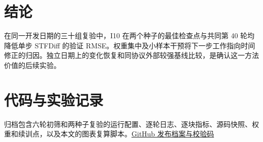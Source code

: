 \documentclass[a4paper,10pt,twocolumn]{article}
\begin{document}
\section{结论}
在同一开发日期的三十组复验中，I10 在两个种子的最佳检查点与共同第 40 轮均降低单步 STFDiff 的验证 RMSE。权重集中及小样本干预将下一步工作指向时间修正的归因。独立日期上的变化恢复和同协议外部较强基线比较，是确认这一方法价值的后续实验。

\section*{代码与实验记录}
归档包含六轮初筛和两种子复验的运行配置、逐轮日志、逐块指标、源码快照、权重和续训点，以及本文的图表复算脚本。\href{https://github.com/qing1989620/paper-shikongyaogan/releases/tag/stf-stage-20261125}{GitHub 发布档案与校验码}

\FloatBarrier
\balance


\end{document}
